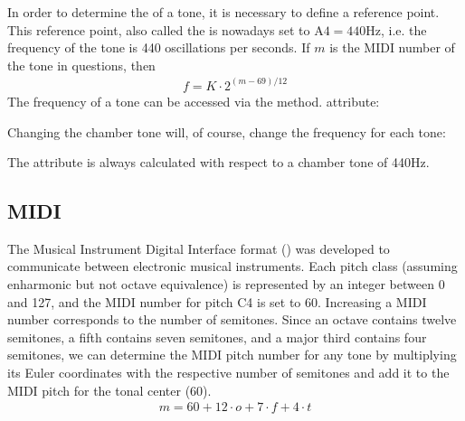 \documentclass[letterpaper,10pt,english]{sphinxmanual}
\begin{document}
In order to determine the  of a tone, it is necessary to define a reference point.
This reference point, also called the  is nowadays set to \(\text{A}4=440\text{Hz}\),
i.e. the frequency of the tone  is 440 oscillations per seconds. If \(m\) is the MIDI
number of the tone in questions, then
\begin{equation*}
\begin{split}f = K \cdot 2^{(m - 69)/12}\end{split}
\end{equation*}
The frequency of a tone can be accessed via the {\hyperref[\detokenize{api:musictheory.Tone.get_frequency}]{}} method.
attribute:

\begin{sphinxVerbatim}[commandchars=\\\{\}]
 
\end{sphinxVerbatim}

Changing the chamber tone will, of course, change the frequency for each tone:

\begin{sphinxVerbatim}[commandchars=\\\{\}]
 
\end{sphinxVerbatim}

The  attribute is always calculated with respect to a chamber tone of 440Hz.


\subsection{MIDI}
\label{\detokenize{2_fundamentals1:midi}}
The Musical Instrument Digital Interface format () was developed to communicate
between electronic musical instruments. Each pitch class (assuming enharmonic but not
octave equivalence) is represented by an integer between 0 and 127, and the MIDI number
for pitch C4 is set to 60. Increasing a MIDI number corresponds to the number of semitones.
Since an octave contains twelve semitones, a fifth contains seven semitones, and a major
third contains four semitones, we can determine the MIDI pitch number for any tone 
by multiplying its Euler coordinates with the respective number of semitones and add it to
the MIDI pitch for the tonal center (60).
\begin{equation*}
\begin{split}m = 60 + 12 \cdot o + 7 \cdot f + 4 \cdot t\end{split}
\end{equation*}
\end{document}
